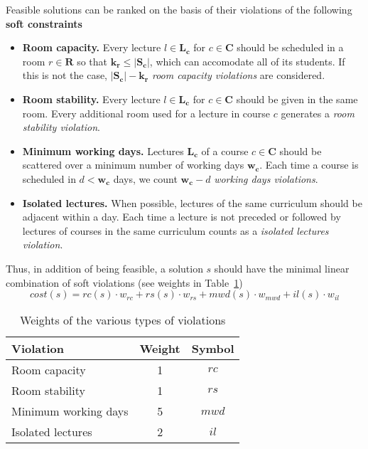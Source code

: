 \documentclass{llncs}
\begin{document}
\noindent
Feasible solutions can be ranked on the basis of their violations of the following \textbf{soft constraints}

\begin{itemize}
     \item \textbf{Room capacity.} Every lecture $l \in \mathbf{L_c}$ for $c \in \mathbf{C}$ should be scheduled in a room $r \in \mathbf{R}$ so that $\mathbf{k_r} \leq |\mathbf{S_c}|$, which can accomodate all of its students. If this is not the case, $|\mathbf{S_c}| - \mathbf{k_r}$ \emph{room capacity violations} are considered. 
     \item \textbf{Room stability.} Every lecture $l \in \mathbf{L_c}$ for $c \in \mathbf{C}$ should be given in the same room. Every additional room used for a lecture in course $c$ generates a \emph{room stability violation}.
     \item \textbf{Minimum working days.} Lectures $\mathbf{L_c}$ of a course $c \in \mathbf{C}$ should be scattered over a minimum number of working days $\mathbf{w_c}$. Each time a course is scheduled in $d < \mathbf{w_c}$ days, we count $\mathbf{w_c}-d$ \emph{working days violations}.
     \item \textbf{Isolated lectures.} When possible, lectures of the same curriculum should be adjacent within a day. Each time a lecture is not preceded or followed by lectures of courses in the same curriculum counts as a \emph{isolated lectures violation}.
\end{itemize}

\vspace{0.1cm}
\noindent
Thus, in addition of being feasible, a solution $s$ should have the minimal linear combination of soft violations (see weights in Table~\ref{tab:weights}) 
%
\begin{equation}
    \label{eqn:cost}
    cost(s) = rc(s) \cdot w_{rc} + rs(s) \cdot w_{rs} + mwd(s) \cdot w_{mwd} + il(s) \cdot w_{il} 
\end{equation}
\vspace{-0.8cm}
\begin{table}
    \centering
    \begin{tabular}{|l|c|c|}
        \hline
        \textbf{Violation} & \textbf{Weight} & \textbf{Symbol} \\
        \hline
        Room capacity          & 1  & $rc$    \\
        Room stability         & 1  & $rs$    \\
        Minimum working days   & 5  & $mwd$    \\
        Isolated lectures      & 2  & $il$    \\
        \hline
    \end{tabular}
    \vspace{0.22cm}
    \caption{Weights of the various types of violations \cite{BDDS12} \label{tab:weights}}
\end{table}
 
\end{document}
